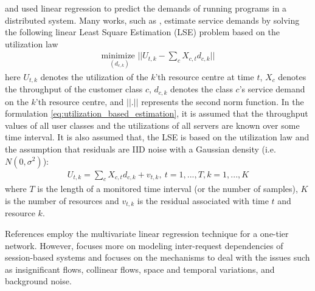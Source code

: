 \cite{rolia_parameter_1995} and \cite{rolia_correlating_1998} used linear regression to predict the demands of running programs in a distributed system. Many works, such as \cite{pacifici_cpu_2008}, estimate service demands by solving the following linear Least Square Estimation (LSE) problem based on the utilization law %
  \begin{align}     \label{eq:utilization_based_estimation}
    \underset{(d_{c,k})} {\text{minimize } }   ||U_{t,k} -  \sum_{c} X_{c,t}  d_{c,k}||   
  \end{align} 
  here $U_{t,k}$ denotes the utilization of the $k$'th resource centre at time $t$, $X_c$ denotes the throughput of the customer class $c$, $d_{c,k}$ denotes the class $c$'s service demand on the $k$'th resource centre, and $||.||$  represents the second norm function. In the formulation \ref{eq:utilization_based_estimation}, it is assumed that the throughput values of all user classes and the utilizations of all servers are known over some time interval. It is also assumed that, the LSE is based on the utilization law and the assumption that residuals are IID noise with a Gaussian density (i.e. $N(0, \sigma^2)$): 
 \begin{align}
 U_{t,k} = \sum_{c} X_{c,t}  d_{c,k} + v_{t,k},\   t=1,...,T , k=1,...,K 
  \end{align}
 where $T$ is the length of a monitored time interval (or the number of samples), $K$ is the number of resources and $v_{t,k}$ is the residual associated with time $t$ and resource $k$.   

 References \cite{pacifici_cpu_2008,zhang_regression-based_2007} employ the multivariate linear regression technique for a one-tier network. However, \cite{zhang_regression-based_2007} focuses more on modeling inter-request dependencies of session-based systems and \cite{pacifici_cpu_2008} focuses on the mechanisms to deal with the issues such as insignificant flows, collinear flows, space and temporal variations, and background noise. 
 
